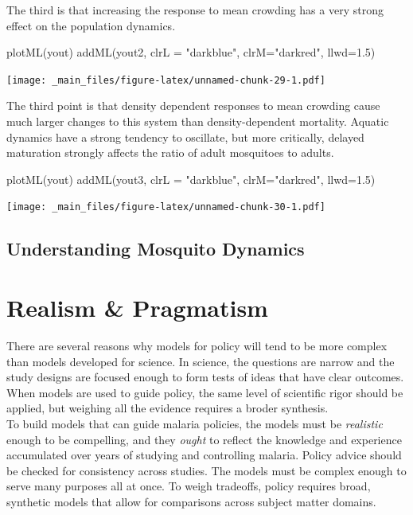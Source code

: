 \documentclass[
]{book}
\newenvironment{Shaded}{\begin{snugshade}}{\end{snugshade}}
\newcommand{\AttributeTok}[1]{\textcolor[rgb]{0.77,0.63,0.00}{#1}}
\newcommand{\FloatTok}[1]{\textcolor[rgb]{0.00,0.00,0.81}{#1}}
\newcommand{\FunctionTok}[1]{\textcolor[rgb]{0.00,0.00,0.00}{#1}}
\newcommand{\NormalTok}[1]{#1}
\newcommand{\StringTok}[1]{\textcolor[rgb]{0.31,0.60,0.02}{#1}}
\begin{document}
The third is that increasing the response to mean crowding has a very strong effect on the population dynamics.

\begin{Shaded}
\begin{Highlighting}[]
\FunctionTok{plotML}\NormalTok{(yout)}
\FunctionTok{addML}\NormalTok{(yout2, }\AttributeTok{clrL =} \StringTok{"darkblue"}\NormalTok{, }\AttributeTok{clrM=}\StringTok{"darkred"}\NormalTok{, }\AttributeTok{llwd=}\FloatTok{1.5}\NormalTok{)}
\end{Highlighting}
\end{Shaded}

\texttt{[image: \_main\_files/figure-latex/unnamed-chunk-29-1.pdf]}

The third point is that density dependent responses to mean crowding cause much larger changes to this system than density-dependent mortality. Aquatic dynamics have a strong tendency to oscillate, but more critically, delayed maturation strongly affects the ratio of adult mosquitoes to adults.

\begin{Shaded}
\begin{Highlighting}[]
\FunctionTok{plotML}\NormalTok{(yout)}
\FunctionTok{addML}\NormalTok{(yout3, }\AttributeTok{clrL =} \StringTok{"darkblue"}\NormalTok{, }\AttributeTok{clrM=}\StringTok{"darkred"}\NormalTok{, }\AttributeTok{llwd=}\FloatTok{1.5}\NormalTok{)}
\end{Highlighting}
\end{Shaded}

\texttt{[image: \_main\_files/figure-latex/unnamed-chunk-30-1.pdf]}

\hypertarget{understanding-mosquito-dynamics}{%
\section{Understanding Mosquito Dynamics}\label{understanding-mosquito-dynamics}}

\hypertarget{realism-pragmatism}{%
\chapter{Realism \& Pragmatism}\label{realism-pragmatism}}

There are several reasons why models for policy will tend to be more complex than models developed for science.
In science, the questions are narrow and the study designs are focused enough to form tests of ideas that have clear outcomes.
When models are used to guide policy, the same level of scientific rigor should be applied, but weighing all the evidence requires a broder synthesis.\\
To build models that can guide malaria policies, the models must be \emph{realistic} enough to be compelling, and they \emph{ought} to reflect the knowledge and experience accumulated over years of studying and controlling malaria.
Policy advice should be checked for consistency across studies.
The models must be complex enough to serve many purposes all at once.
To weigh tradeoffs, policy requires broad, synthetic models that allow for comparisons across subject matter domains.
\end{document}
